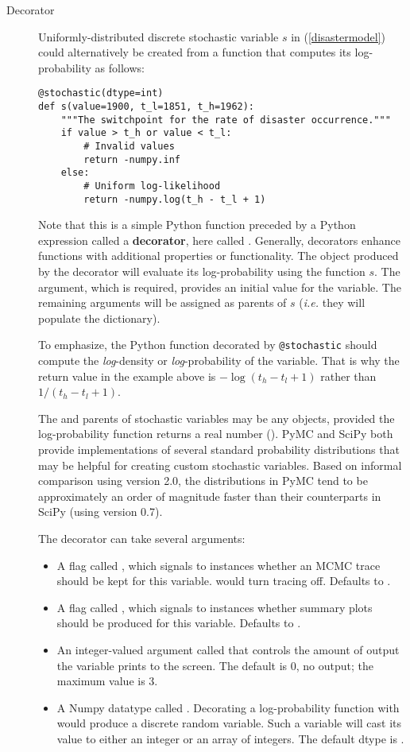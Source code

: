 \begin{description}
    
    \item[Decorator] Uniformly-distributed discrete stochastic variable $s$ in (\ref{disastermodel}) could alternatively be created from a function that computes its log-probability as follows:
\begin{verbatim}
@stochastic(dtype=int)
def s(value=1900, t_l=1851, t_h=1962):
    """The switchpoint for the rate of disaster occurrence."""
    if value > t_h or value < t_l:
        # Invalid values
        return -numpy.inf
    else:
        # Uniform log-likelihood
        return -numpy.log(t_h - t_l + 1) 
\end{verbatim}
Note that this is a simple Python function preceded by a Python expression called a \textbf{decorator}, here called . Generally, decorators enhance functions with additional properties or functionality. The  object produced by the  decorator will evaluate its log-probability using the function $s$. The  argument, which is required, provides an initial value for the variable. The remaining arguments will be assigned as parents of $s$ (\emph{i.e.} they will populate the  dictionary).

To emphasize, the Python function decorated by \texttt{@stochastic} should compute the \emph{log}-density or \emph{log}-probability of the variable. That is why the return value in the example above is $-\log(t_h-t_l+1)$ rather than $1/(t_h-t_l+1)$.

The  and parents of stochastic variables may be any objects, provided the log-probability function returns a real number (). PyMC and SciPy both provide implementations of several standard probability distributions that may be helpful for creating custom stochastic variables. Based on informal comparison using version 2.0, the distributions in PyMC tend to be approximately an order of magnitude faster than their counterparts in SciPy (using version 0.7).

    The decorator  can take several arguments: 
    \begin{itemize}
        \item A flag called , which signals to  instances whether an MCMC trace should be kept for this variable.  would turn tracing off. Defaults to .
        \item A flag called , which signals to  instances whether summary plots should be produced for this variable. Defaults to .
        \item An integer-valued argument called  that controls the amount of output the variable prints to the screen. The default is $0$, no output; the maximum value is $3$. 
        \item A Numpy datatype called . Decorating a log-probability function with  would produce a discrete random variable. Such a variable will cast its value to either an integer or an array of integers. The default dtype is .
    \end{itemize} 


\end{description}
